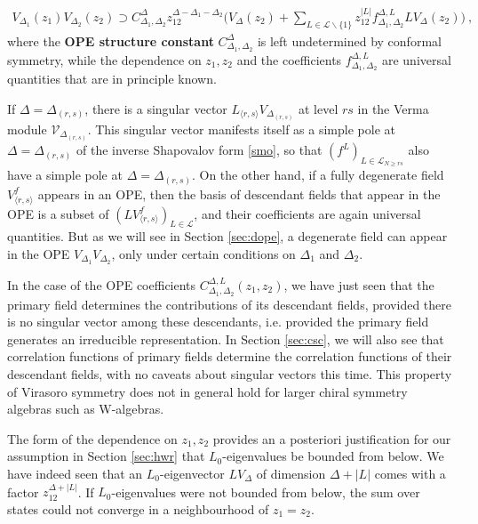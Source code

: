 \documentclass[12pt, a4paper]{article}
\newcommand{\myindex}[1]{\textbf{\boldmath #1}}
\begin{document}
\begin{align}
 \boxed{V_{\Delta_1}(z_1)V_{\Delta_2}(z_2) \supset  C_{\Delta_1,\Delta_2}^{\Delta} z_{12}^{\Delta-\Delta_1-\Delta_2} \Bigg(V_\Delta(z_2) +\sum_{L\in \mathcal{L}\backslash\{1\}}z_{12}^{|L|} f^{\Delta,L}_{\Delta_1,\Delta_2} LV_\Delta(z_2)\Bigg)}
 \ ,
 \label{prope}
\end{align}
where the \myindex{OPE structure constant} $C^\Delta_{\Delta_1,\Delta_2}$ is left undetermined by conformal symmetry, while the dependence on $z_1,z_2$ and the coefficients $f^{\Delta,L}_{\Delta_1,\Delta_2}$ are universal quantities that are in principle known. 

If $\Delta=\Delta_{(r,s)}$, there is a singular vector $L_{\langle r,s\rangle} V_{\Delta_{(r,s)}}$ at level $rs$ in the Verma module $\mathcal{V}_{\Delta_{(r,s)}}$. This singular vector manifests itself as a simple pole at $\Delta=\Delta_{(r,s)}$ of the inverse Shapovalov form \eqref{smo}, so that $(f^L)_{L\in\mathcal{L}_{N\geq rs}}$ also have a simple pole at $\Delta=\Delta_{(r,s)}$. On the other hand, if a fully degenerate field $V^f_{\langle r,s\rangle}$ appears in an OPE, then the basis of descendant fields that appear in the OPE is a subset of $(LV^f_{\langle r,s\rangle})_{L\in\mathcal{L}}$, and their coefficients are again universal quantities. But as we will see in Section \ref{sec:dope}, a degenerate field can appear in the OPE $V_{\Delta_1}V_{\Delta_2}$, only under certain conditions on $\Delta_1$ and $\Delta_2$.

In the case of the OPE coefficients $C^{\Delta,L}_{\Delta_1,\Delta_2}(z_1,z_2)$, we have just seen that the primary field determines the contributions of its descendant fields, provided there is no singular vector among these descendants, i.e. provided the primary field generates an irreducible representation. In Section \ref{sec:csc}, we will also see that correlation functions of primary fields determine the correlation functions of their descendant fields, with no caveats about singular vectors this time. This property of Virasoro symmetry does not in general hold for larger chiral symmetry algebras such as W-algebras.

The form of the dependence on $z_1,z_2$ provides an a posteriori justification for our assumption in Section \ref{sec:hwr} that $L_0$-eigenvalues be bounded from below. We have indeed seen that an $L_0$-eigenvector $LV_\Delta$ of dimension $\Delta+|L|$ comes with a factor $z_{12}^{\Delta+|L|}$. If $L_0$-eigenvalues were not bounded from below, the sum over states could not converge in a neighbourhood of $z_1=z_2$. 
\end{document}
